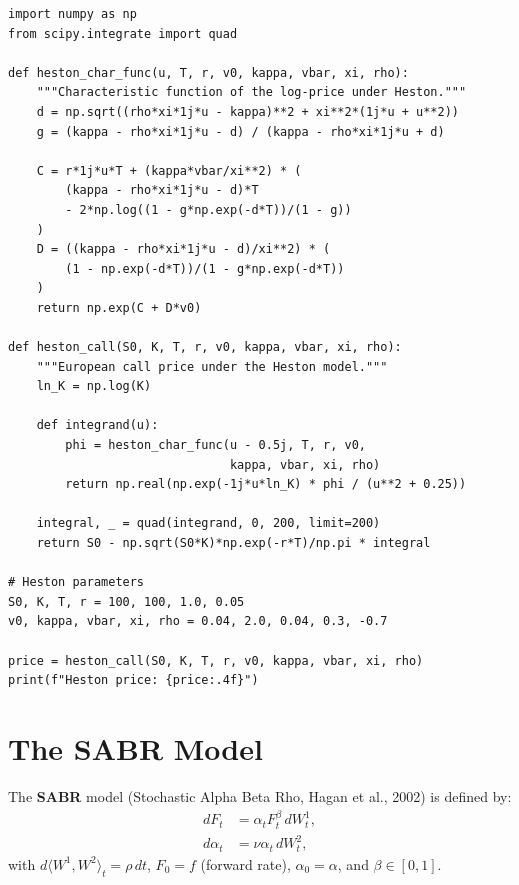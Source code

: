\begin{codeblock}[title=\textbf{Heston Pricing via Fourier Transform}]
\begin{verbatim}
import numpy as np
from scipy.integrate import quad

def heston_char_func(u, T, r, v0, kappa, vbar, xi, rho):
    """Characteristic function of the log-price under Heston."""
    d = np.sqrt((rho*xi*1j*u - kappa)**2 + xi**2*(1j*u + u**2))
    g = (kappa - rho*xi*1j*u - d) / (kappa - rho*xi*1j*u + d)

    C = r*1j*u*T + (kappa*vbar/xi**2) * (
        (kappa - rho*xi*1j*u - d)*T
        - 2*np.log((1 - g*np.exp(-d*T))/(1 - g))
    )
    D = ((kappa - rho*xi*1j*u - d)/xi**2) * (
        (1 - np.exp(-d*T))/(1 - g*np.exp(-d*T))
    )
    return np.exp(C + D*v0)

def heston_call(S0, K, T, r, v0, kappa, vbar, xi, rho):
    """European call price under the Heston model."""
    ln_K = np.log(K)

    def integrand(u):
        phi = heston_char_func(u - 0.5j, T, r, v0,
                               kappa, vbar, xi, rho)
        return np.real(np.exp(-1j*u*ln_K) * phi / (u**2 + 0.25))

    integral, _ = quad(integrand, 0, 200, limit=200)
    return S0 - np.sqrt(S0*K)*np.exp(-r*T)/np.pi * integral

# Heston parameters
S0, K, T, r = 100, 100, 1.0, 0.05
v0, kappa, vbar, xi, rho = 0.04, 2.0, 0.04, 0.3, -0.7

price = heston_call(S0, K, T, r, v0, kappa, vbar, xi, rho)
print(f"Heston price: {price:.4f}")
\end{verbatim}
\end{codeblock}

\section{The SABR Model}

\begin{definition}
The \textbf{SABR} model (Stochastic Alpha Beta Rho, Hagan et al., 2002)
is defined by:
\begin{align}
    dF_t &= \alpha_t F_t^\beta\,dW_t^1, \\
    d\alpha_t &= \nu\alpha_t\,dW_t^2,
\end{align}
with $d\langle W^1, W^2\rangle_t = \rho\,dt$, $F_0 = f$ (forward rate),
$\alpha_0 = \alpha$, and $\beta \in [0,1]$.
\end{definition}

